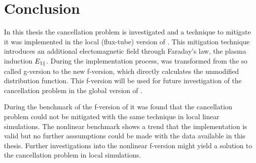 
\NewPage
\chapter{Conclusion}
\label{chap:close}

\thispagestyle{empty}
\newpage

In this thesis the cancellation problem is investigated and a technique to mitigate it was implemented in the local (flux-tube) version of {\gkw}. This mitigation technique introduces an additional electomagnetic field through Faraday's law, the plasma induction $E_{1\parallel}$. During the implementation process, {\gkw} was transformed from the so called g-version to the new f-version, which directly calculates the unmodified distribution function. This f-version will be used for future investigation of the cancellation problem in the global version of {\gkw}. \bigskip

During the benchmark of the f-version of {\gkw} it was found that the cancellation problem could not be mitigated with the same technique in local linear simulations. The nonlinear benchmark shows a trend that the implementation is valid but no further asssumptions could be made with the data available in this thesis. Further investigations into the nonlinear f-version might yield a solution to the cancellation problem in local simulations.